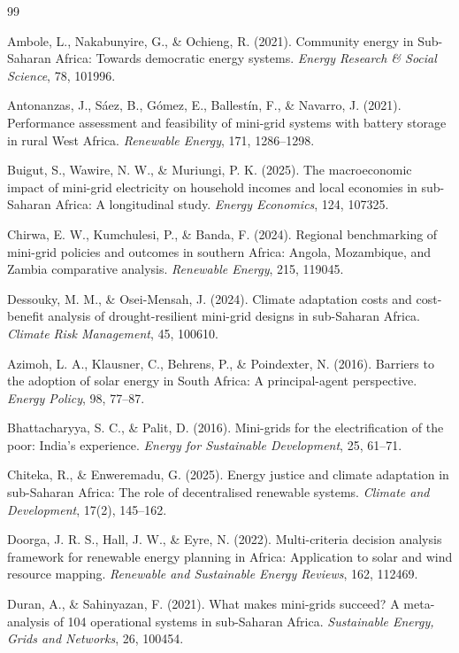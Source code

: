 \documentclass[12pt, a4paper]{article}
\begin{document}
\begin{thebibliography}{99}

 Ambole, L., Nakabunyire, G., \& Ochieng, R. (2021). Community energy in Sub-Saharan Africa: Towards democratic energy systems. \textit{Energy Research \& Social Science}, 78, 101996.

 Antonanzas, J., Sáez, B., Gómez, E., Ballestín, F., \& Navarro, J. (2021). Performance assessment and feasibility of mini-grid systems with battery storage in rural West Africa. \textit{Renewable Energy}, 171, 1286--1298.

 Buigut, S., Wawire, N. W., \& Muriungi, P. K. (2025). The macroeconomic impact of mini-grid electricity on household incomes and local economies in sub-Saharan Africa: A longitudinal study. \textit{Energy Economics}, 124, 107325.

 Chirwa, E. W., Kumchulesi, P., \& Banda, F. (2024). Regional benchmarking of mini-grid policies and outcomes in southern Africa: Angola, Mozambique, and Zambia comparative analysis. \textit{Renewable Energy}, 215, 119045.

 Dessouky, M. M., \& Osei-Mensah, J. (2024). Climate adaptation costs and cost-benefit analysis of drought-resilient mini-grid designs in sub-Saharan Africa. \textit{Climate Risk Management}, 45, 100610.

 Azimoh, L. A., Klausner, C., Behrens, P., \& Poindexter, N. (2016). Barriers to the adoption of solar energy in South Africa: A principal-agent perspective. \textit{Energy Policy}, 98, 77--87.

 Bhattacharyya, S. C., \& Palit, D. (2016). Mini-grids for the electrification of the poor: India's experience. \textit{Energy for Sustainable Development}, 25, 61--71.

 Chiteka, R., \& Enweremadu, G. (2025). Energy justice and climate adaptation in sub-Saharan Africa: The role of decentralised renewable systems. \textit{Climate and Development}, 17(2), 145--162.

 Doorga, J. R. S., Hall, J. W., \& Eyre, N. (2022). Multi-criteria decision analysis framework for renewable energy planning in Africa: Application to solar and wind resource mapping. \textit{Renewable and Sustainable Energy Reviews}, 162, 112469.

 Duran, A., \& Sahinyazan, F. (2021). What makes mini-grids succeed? A meta-analysis of 104 operational systems in sub-Saharan Africa. \textit{Sustainable Energy, Grids and Networks}, 26, 100454.


\end{thebibliography}
\end{document}
